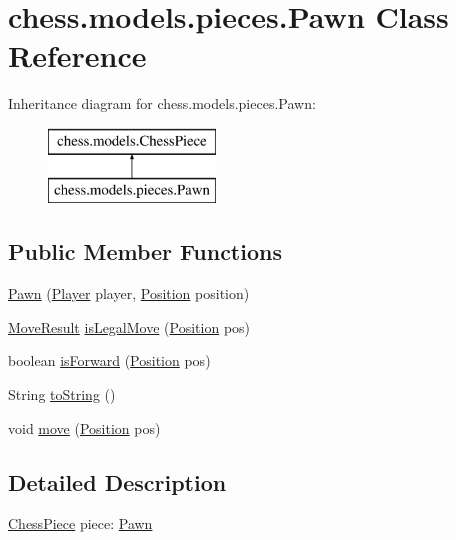 \hypertarget{classchess_1_1models_1_1pieces_1_1_pawn}{}\section{chess.\+models.\+pieces.\+Pawn Class Reference}
\label{classchess_1_1models_1_1pieces_1_1_pawn}
Inheritance diagram for chess.\+models.\+pieces.\+Pawn\+:\begin{figure}[H]
\begin{center}
\leavevmode
\includegraphics[height=2.000000cm]{classchess_1_1models_1_1pieces_1_1_pawn}
\end{center}
\end{figure}
\subsection*{Public Member Functions}
\begin{DoxyCompactItemize}
\item 
\mbox{\hyperlink{classchess_1_1models_1_1pieces_1_1_pawn_aa62632674360fd0518f583bf1477b8c1}{Pawn}} (\mbox{\hyperlink{enumchess_1_1models_1_1enums_1_1_player}{Player}} player, \mbox{\hyperlink{classchess_1_1models_1_1_position}{Position}} position)
\item 
\mbox{\hyperlink{enumchess_1_1models_1_1enums_1_1_move_result}{Move\+Result}} \mbox{\hyperlink{classchess_1_1models_1_1pieces_1_1_pawn_ae293ed0d437de535ad14a543a1077871}{is\+Legal\+Move}} (\mbox{\hyperlink{classchess_1_1models_1_1_position}{Position}} pos)
\item 
boolean \mbox{\hyperlink{classchess_1_1models_1_1pieces_1_1_pawn_a80055e2b99a160f4de32644423460a6f}{is\+Forward}} (\mbox{\hyperlink{classchess_1_1models_1_1_position}{Position}} pos)
\item 
String \mbox{\hyperlink{classchess_1_1models_1_1pieces_1_1_pawn_a97538699aaa1cb69482ad9c218562450}{to\+String}} ()
\item 
void \mbox{\hyperlink{classchess_1_1models_1_1pieces_1_1_pawn_afb8291b2ab13822506cccad5dbe8fc91}{move}} (\mbox{\hyperlink{classchess_1_1models_1_1_position}{Position}} pos)
\end{DoxyCompactItemize}


\subsection{Detailed Description}
\mbox{\hyperlink{classchess_1_1models_1_1_chess_piece}{Chess\+Piece}} piece\+: \mbox{\hyperlink{classchess_1_1models_1_1pieces_1_1_pawn}{Pawn}} 

